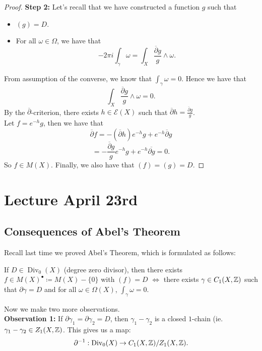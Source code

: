 \documentclass{article}
\begin{document}
{\begin{proof}
    \item \textbf{Step 2:} Let's recall that we have constructed a function $g$ such that
    \begin{itemize}
        \item $(g) = D$.
        \item For all $\omega \in \Omega$, we have that
        \[-2\pi i \int_{\gamma} \omega = \int_X \frac{\overline{\partial} g}{g} \wedge \omega. \]
    \end{itemize}
    From assumption of the converse, we know that $\int_{\gamma} \omega = 0$. Hence we have that
    \[\int_X \frac{\overline{\partial} g}{g} \wedge \omega = 0.\]
    By the $\overline{\partial}$-criterion, there exists $h \in \mathcal{E}(X)$ such that $\overline{\partial} h = \frac{\overline{\partial} g}{g}$.\\

    Let $f = e^{-h} g$, then we have that
    \[\overline{\partial} f = - (\overline{\partial} h) e^{-h} g + e^{-h} \overline{\partial} g \]
    \[= -\frac{\overline{\partial} g}{g}  e^{-h} g + e^{-h} \overline{\partial g} = 0.\]
    So $f \in M(X)$. Finally, we also have that $(f) = (g) = D$.
\end{proof}

\newpage
\section{Lecture April 23rd}

\subsection{Consequences of Abel's Theorem}
Recall last time we proved Abel's Theorem, which is formulated as follows:

\begin{theorem}
    If $D \in \operatorname{Div}_0(X)$ (degree zero divisor), then there exists $f \in M(X)^\bullet \coloneqq M(X) - \{0\}$ with $(f) = D$ $\iff$ there exists $\gamma \in C_1(X, \mathbb{Z})$ such that $\partial \gamma = D$ and for all $\omega \in \Omega(X)$, $\int_\gamma \omega = 0$.
\end{theorem}

Now we make two more observations.\\

\textbf{Observation 1: } If $\partial \gamma_1 = \partial \gamma_2 = D$, then $\gamma_1 - \gamma_2$ is a closed $1$-chain (ie. $\gamma_1 - \gamma_2 \in Z_1(X, \mathbb{Z})$. This gives us a map:
\[\partial^{-1}: \operatorname{Div}_0(X) \to C_1(X, \mathbb{Z})/Z_1(X, \mathbb{Z}) .\]

}
\end{document}
